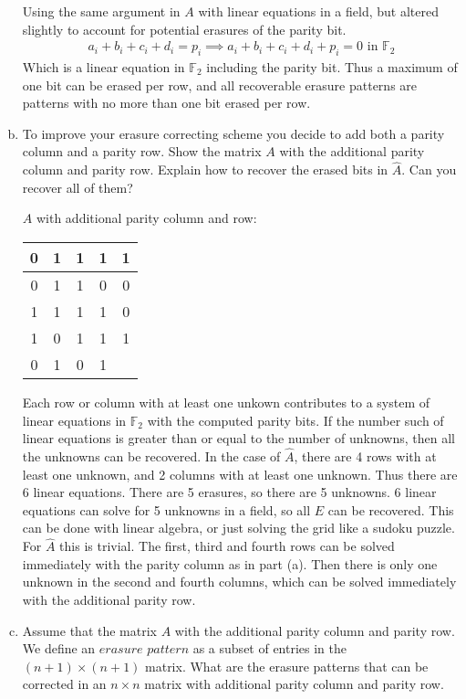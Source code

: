 \documentclass{article}
\begin{document}
\begin{enumerate}[(a)]
    \vspace{5mm}

    Using the same argument in $A$ with linear equations in a field, but
    altered slightly to account for potential erasures of the parity bit.
    \begin{align*}
      a_i + b_i + c_i + d_i = p_i \implies a_i + b_i + c_i + d_i + p_i = 0
      \text{ in $\mathbb{F}_2$}
    \end{align*}
    Which is a linear equation in $\mathbb{F}_2$ including the parity bit.
    Thus a maximum of one bit can be erased per row, and all recoverable
    erasure patterns are patterns with no more than one bit erased per row.
  \item
    To improve your erasure correcting scheme you decide to add both a parity
    column and a parity row. Show the matrix $A$ with the additional parity
    column and parity row. Explain how to recover the erased bits in
    $\hat{A}$. Can you recover all of them?

    \vspace{5mm}

    $A$ with additional parity column and row:
    \begin{tabular}{| c | c | c | c | c |}
      \hline
      0 & 1 & 1 & 1 & 1 \\
      \hline
      0 & 1 & 1 & 0 & 0 \\
      \hline
      1 & 1 & 1 & 1 & 0 \\
      \hline
      1 & 0 & 1 & 1 & 1 \\
      \hline
      0 & 1 & 0 & 1 & \\
      \hline
    \end{tabular}

    \vspace{5mm}

    Each row or column with at least one unkown contributes to a system of
    linear equations in $\mathbb{F}_2$ with the computed parity bits. If the
    number such of linear equations is greater than or equal to the number
    of unknowns, then all the unknowns can be recovered. In the case of
    $\hat{A}$, there are 4 rows with at least one unknown, and 2 columns with
    at least one unknown. Thus there are 6 linear equations. There are 5
    erasures, so there are 5 unknowns. 6 linear equations can solve for 5
    unknowns in a field, so all $E$ can be recovered. This can be done with
    linear algebra, or just solving the grid like a sudoku puzzle. For
    $\hat{A}$ this is trivial. The first, third and fourth rows can be solved
    immediately with the parity column as in part (a). Then there is only one
    unknown in the second and fourth columns, which can be solved immediately
    with the additional parity row.
  \item
    Assume that the matrix $A$ with the additional parity column and parity
    row. We define an $erasure$ $pattern$ as a subset of entries in the
    $(n+1)\times(n+1)$ matrix. What are the erasure patterns that can be
    corrected in an $n \times n$ matrix with additional parity column and
    parity row.


\end{enumerate}
\end{document}
